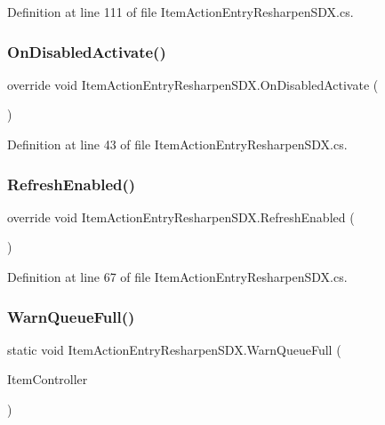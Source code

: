 Definition at line 111 of file Item\+Action\+Entry\+Resharpen\+S\+D\+X.\+cs.

\mbox{\label{class_item_action_entry_resharpen_s_d_x_aaceea0c8f316332271b4c72bcaf5619b}} 
\subsubsection{\texorpdfstring{OnDisabledActivate()}{OnDisabledActivate()}}
{\footnotesize\ttfamily override void Item\+Action\+Entry\+Resharpen\+S\+D\+X.\+On\+Disabled\+Activate (\begin{DoxyParamCaption}{ }\end{DoxyParamCaption})}



Definition at line 43 of file Item\+Action\+Entry\+Resharpen\+S\+D\+X.\+cs.

\mbox{\label{class_item_action_entry_resharpen_s_d_x_a524f80b83cfc9eb840aa654215f3ed1b}} 
\subsubsection{\texorpdfstring{RefreshEnabled()}{RefreshEnabled()}}
{\footnotesize\ttfamily override void Item\+Action\+Entry\+Resharpen\+S\+D\+X.\+Refresh\+Enabled (\begin{DoxyParamCaption}{ }\end{DoxyParamCaption})}



Definition at line 67 of file Item\+Action\+Entry\+Resharpen\+S\+D\+X.\+cs.

\mbox{\label{class_item_action_entry_resharpen_s_d_x_af7e651fba91d1e3b636b748e658f63e7}} 
\subsubsection{\texorpdfstring{WarnQueueFull()}{WarnQueueFull()}}
{\footnotesize\ttfamily static void Item\+Action\+Entry\+Resharpen\+S\+D\+X.\+Warn\+Queue\+Full (\begin{DoxyParamCaption}\item[{X\+Ui\+Controller}]{Item\+Controller }\end{DoxyParamCaption})\hspace{0.3cm}{\ttfamily [static]}}




